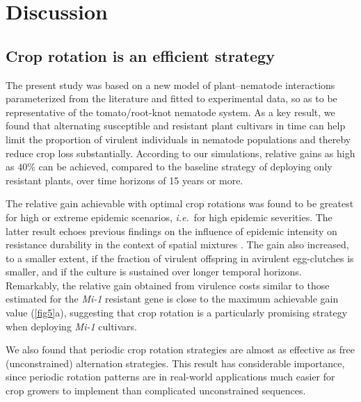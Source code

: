 {{{{ 


\section{Discussion}

\subsection{Crop rotation is an efficient strategy} \label{discussion:part1}

The present study was based on a new model of plant–nematode
interactions parameterized from the literature and fitted to
experimental data, so as to be representative of the tomato/root-knot
nematode system. As a key result, we found that alternating
susceptible and resistant plant cultivars in time can help limit the
proportion of virulent individuals in nematode populations and thereby
reduce crop loss substantially. According to our
simulations, relative gains as high as $40\%$ can be achieved,
compared to the baseline strategy of deploying only resistant plants,
over time horizons of 15 years or more.

The relative gain achievable with optimal crop rotations was found to
be greatest for high or extreme epidemic scenarios, \textit{i.e.}\  for
high {epidemic severities}. The latter result echoes previous findings
on the influence of epidemic intensity on resistance durability in the
context of spatial mixtures \citep{vandenBosch2003,Fabre2012}.  The
gain also increased, to a smaller extent, if the fraction of virulent
offspring in avirulent egg-clutches is smaller, and if the culture is
sustained over longer temporal horizons. Remarkably, the relative gain
obtained from virulence costs similar to those estimated for the
\textit{Mi-1} resistant gene is close to the maximum achievable gain
value (\autoref{fig5}a), suggesting that crop rotation is a
particularly promising strategy when deploying \textit{Mi-1}
cultivars.

We also found that periodic crop rotation strategies are almost as
effective as free (unconstrained) alternation strategies. This result
has considerable importance, since periodic rotation patterns are
in real-world applications much easier for crop growers to implement
than complicated unconstrained sequences. 

}}}}

